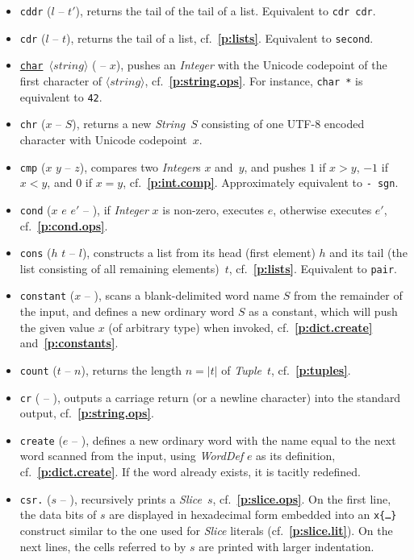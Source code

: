 \documentclass[12pt,oneside]{article}
\def\refpoint#1{{\rm\textbf{\ref{#1}}}}
\let\ptref=\refpoint
\begin{document}
\begin{itemize}
\item {\tt cddr} ($l$ -- $t'$), returns the tail of the tail of a list. Equivalent to {\tt cdr cdr}.
\item {\tt cdr} ($l$ -- $t$), returns the tail of a list, cf.~\ptref{p:lists}. Equivalent to {\tt second}.
\item {\tt \underline{char} $\langle\textit{string}\rangle$} ( -- $x$), pushes an {\em Integer\/} with the Unicode codepoint of the first character of {\tt $\langle\textit{string}\rangle$}, cf.~\ptref{p:string.ops}. For instance, {\tt char *} is equivalent to {\tt 42}.
\item {\tt chr} ($x$ -- $S$), returns a new {\em String\/}~$S$ consisting of one UTF-8 encoded character with Unicode codepoint~$x$.
\item {\tt cmp} ($x$ $y$ -- $z$), compares two {\em Integer\/}s $x$ and~$y$, and pushes $1$ if $x>y$, $-1$ if $x<y$, and $0$ if $x=y$, cf.~\ptref{p:int.comp}. Approximately equivalent to {\tt - sgn}.
\item {\tt cond} ($x$ $e$ $e'$ -- ), if {\em Integer\/} $x$ is non-zero, executes $e$, otherwise executes $e'$, cf.~\ptref{p:cond.ops}.
\item {\tt cons} ($h$ $t$ -- $l$), constructs a list from its head (first element) $h$ and its tail (the list consisting of all remaining elements)~$t$, cf.~\ptref{p:lists}. Equivalent to {\tt pair}.
\item {\tt constant} ($x$ -- ), scans a blank-delimited word name $S$ from the remainder of the input, and defines a new ordinary word $S$ as a constant, which will push the given value $x$ (of arbitrary type) when invoked, cf.~\ptref{p:dict.create} and~\ptref{p:constants}.
\item {\tt count} ($t$ -- $n$), returns the length $n=|t|$ of {\em Tuple\/}~$t$, cf.~\ptref{p:tuples}.
\item {\tt cr} ( -- ), outputs a carriage return (or a newline character) into the standard output, cf.~\ptref{p:string.ops}.
\item {\tt create} ($e$ -- ), defines a new ordinary word with the name equal to the next word scanned from the input, using {\em WordDef\/} $e$ as its definition, cf.~\ptref{p:dict.create}. If the word already exists, it is tacitly redefined.
\item {\tt csr.} ($s$ -- ), recursively prints a {\em Slice}~$s$, cf.~\ptref{p:slice.ops}. On the first line, the data bits of $s$ are displayed in hexadecimal form embedded into an {\tt x\{\dots\}} construct similar to the one used for {\em Slice\/} literals (cf.~\ptref{p:slice.lit}). On the next lines, the cells referred to by $s$ are printed with larger indentation.

\end{itemize}
\end{document}
